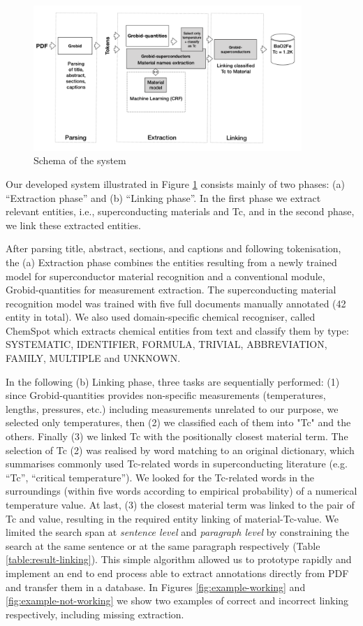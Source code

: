 \documentclass{article}[a4]
\begin{document}
\begin{figure}[]
    \centering
    \includegraphics[width=4in]{schema}
    \caption[Schema of the system] {Schema of the system}
    \label{fig:system-schema}
\end{figure}

Our developed system illustrated in Figure \ref{fig:system-schema} consists mainly of two phases: (a) “Extraction phase” and (b) “Linking phase”. In the first phase we extract relevant entities, i.e., superconducting materials and Tc, and in the second phase, we link these extracted entities.

After parsing title, abstract, sections, and captions and following tokenisation, the (a) Extraction phase combines the entities resulting from a newly trained model for superconductor material recognition and a conventional module, Grobid-quantities for measurement extraction. The superconducting material recognition model was trained with five full documents manually annotated (42 entity in total). We also used domain-specific chemical recogniser, called ChemSpot \cite{10.1093/bioinformatics/bts183} which extracts chemical entities from text and classify them by type: SYSTEMATIC, IDENTIFIER, FORMULA, TRIVIAL, ABBREVIATION, FAMILY, MULTIPLE and UNKNOWN.

In the following (b) Linking phase, three tasks are sequentially performed: (1) since Grobid-quantities provides non-specific measurements (temperatures, lengths, pressures, etc.) including measurements unrelated to our purpose,  we selected only temperatures, then (2) we classified each of them into "Tc" and the others. Finally (3) we linked Tc with the positionally closest material term. 
The selection of Tc (2) was realised by word matching to an original dictionary, which summarises commonly used Tc-related words in superconducting literature (e.g. “Tc”, “critical temperature”). We looked for the Tc-related words in the surroundings (within five words according to empirical probability) of a numerical temperature value. 
At last, (3) the closest material term was linked to the pair of Tc and value, resulting in the required entity linking of material-Tc-value. We limited the search span at \textit{sentence level} and \textit{paragraph level} by constraining the search at the same sentence or at the same paragraph respectively (Table \ref{table:result-linking}).
This simple algorithm allowed us to prototype rapidly and implement an end to end process able to extract annotations directly from PDF and transfer them in a database. In Figures \ref{fig:example-working} and \ref{fig:example-not-working} we show two examples of correct and incorrect linking respectively, including missing extraction. 
\end{document}
